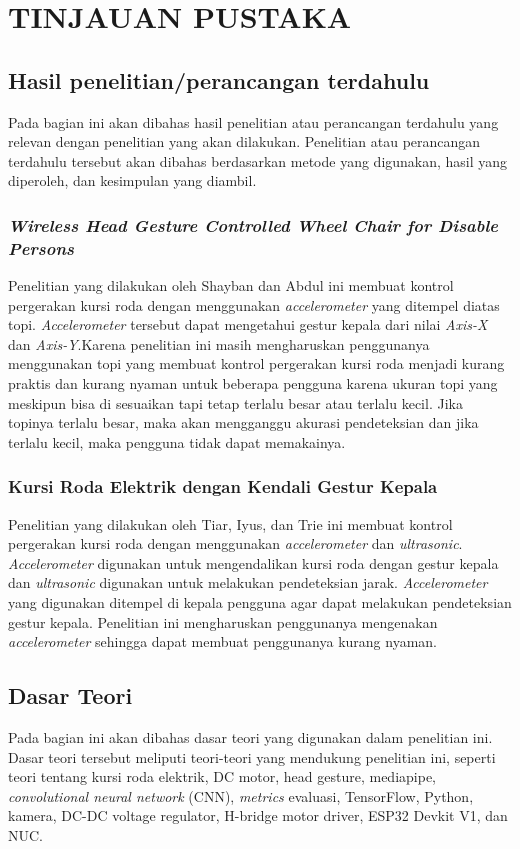 \chapter{TINJAUAN PUSTAKA}
\label{chap:tinjauanpustaka}

\section{Hasil penelitian/perancangan terdahulu}
Pada bagian ini akan dibahas hasil penelitian atau perancangan terdahulu yang relevan dengan penelitian yang akan dilakukan. Penelitian atau perancangan terdahulu tersebut akan dibahas berdasarkan metode yang digunakan, hasil yang diperoleh, dan kesimpulan yang diambil.
\subsection{\emph{Wireless Head Gesture Controlled Wheel Chair for Disable Persons}}
Penelitian yang dilakukan oleh Shayban dan Abdul ini membuat kontrol pergerakan kursi roda dengan menggunakan \emph{accelerometer} yang ditempel diatas topi. \emph{Accelerometer} tersebut dapat mengetahui gestur kepala dari nilai \emph{Axis-X} dan \emph{Axis-Y}.Karena penelitian ini masih mengharuskan penggunanya menggunakan topi yang membuat kontrol pergerakan kursi roda menjadi kurang praktis dan kurang nyaman untuk beberapa pengguna karena ukuran topi yang meskipun bisa di sesuaikan tapi tetap terlalu besar atau terlalu kecil. Jika topinya terlalu besar, maka akan mengganggu akurasi pendeteksian dan jika terlalu kecil, maka pengguna tidak dapat memakainya.

\subsection{Kursi Roda Elektrik dengan Kendali Gestur Kepala}
Penelitian yang dilakukan oleh Tiar, Iyus, dan Trie ini membuat kontrol pergerakan kursi roda dengan menggunakan \emph{accelerometer} dan \emph{ultrasonic}. \emph{Accelerometer} digunakan untuk mengendalikan kursi roda dengan gestur kepala dan \emph{ultrasonic} digunakan untuk melakukan pendeteksian jarak. \emph{Accelerometer} yang digunakan ditempel di kepala pengguna agar dapat melakukan pendeteksian gestur kepala. Penelitian ini mengharuskan penggunanya mengenakan \emph{accelerometer} sehingga dapat membuat penggunanya kurang nyaman.


\section{Dasar Teori}
Pada bagian ini akan dibahas dasar teori yang digunakan dalam penelitian ini. Dasar teori tersebut meliputi teori-teori yang mendukung penelitian ini, seperti teori tentang kursi roda elektrik, DC motor, head gesture, mediapipe, \emph{convolutional neural network} (CNN), \emph{metrics} evaluasi, TensorFlow, Python, kamera, DC-DC voltage regulator, H-bridge motor driver, ESP32 Devkit V1, dan NUC.

